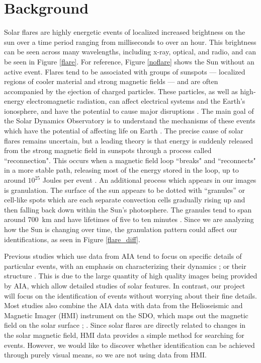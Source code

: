\documentclass[12pt, letterpaper]{article}
\begin{document}
\section*{Background}

Solar flares are highly energetic events of localized increased brightness on the sun over a time period ranging from milliseconds to over an hour. This brightness can be seen across many wavelengths, including x-ray, optical, and radio, and can be seen in Figure \ref{flare}. For reference, Figure \ref{noflare} shows the Sun without an active event. Flares tend to be associated with groups of sunspots — localized regions of cooler material and strong magnetic fields — and are often accompanied by the ejection of charged particles. These particles, as well as high-energy electromagnetic radiation, can affect electrical systems and the Earth’s ionosphere, and have the potential to cause major disruptions \cite{BOB}. The main goal of the Solar Dynamics Observatory is to understand the mechanisms of these events which have the potential of affecting life on Earth \cite{Pesnell2012}. The precise cause of solar flares remains uncertain, but a leading theory is that energy is suddenly released from the strong magnetic field in sunspots through a process called ``reconnection". This occurs when a magnetic field loop ``breaks" and ``reconnects" in a more stable path, releasing most of the energy stored in the loop, up to around $10^25$ Joules per event \cite{BOB}. An additional process which appears in our images is granulation. The surface of the sun appears to be dotted with “granules” or cell-like spots which are each separate convection cells gradually rising up and then falling back down within the Sun’s photosphere. The granules tend to span around 700~km and have lifetimes of five to ten minutes \cite{BOB}. Since we are analyzing how the Sun is changing over time, the granulation pattern could affect our identifications, as seen in Figure \ref{flare_diff}.

Previous studies which use data from AIA tend to focus on specific details of particular events, with an emphasis on characterizing their dynamics \cite{Dai2021}; \cite{Chitta2018} or their structure \cite{Aschwanden2017}. This is due to the large quantity of high quality images being provided by AIA, which allow detailed studies of solar features. In contrast, our project will focus on the identification of events without worrying about their fine details. Most studies also combine the AIA data with data from the Helioseismic and Magnetic Imager (HMI) instrument on the SDO, which maps out the magnetic field on the solar surface \cite{Dai2021}; \cite{Chitta2018}. Since solar flares are directly related to changes in the solar magnetic field, HMI data provides a simple method for searching for events. However, we would like to discover whether identification can be achieved through purely visual means, so we are not using data from HMI.
\end{document}
